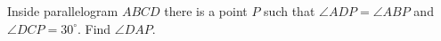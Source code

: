 Inside parallelogram $ABCD$ there is a point $P$ such that $\angle ADP=\angle ABP$ and $\angle DCP=30^\circ$. Find $\angle DAP$.
